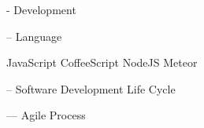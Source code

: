 - Development

-- Language

JavaScript
  CoffeeScript
NodeJS
Meteor

-- Software Development Life Cycle

--- Agile Process




